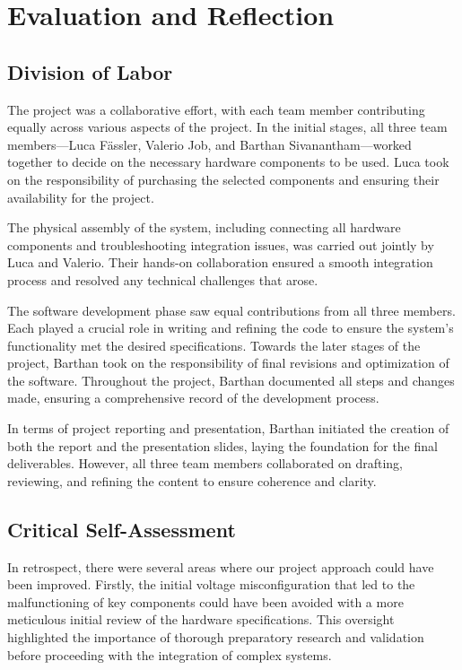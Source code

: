 \documentclass{article}
\begin{document}
\section{Evaluation and Reflection}

\subsection{Division of Labor}
The project was a collaborative effort, with each team member contributing equally across various aspects of the project. In the initial stages, all three team members—Luca Fässler, Valerio Job, and Barthan Sivanantham—worked together to decide on the necessary hardware components to be used. Luca took on the responsibility of purchasing the selected components and ensuring their availability for the project.

The physical assembly of the system, including connecting all hardware components and troubleshooting integration issues, was carried out jointly by Luca and Valerio. Their hands-on collaboration ensured a smooth integration process and resolved any technical challenges that arose.

The software development phase saw equal contributions from all three members. Each played a crucial role in writing and refining the code to ensure the system's functionality met the desired specifications. Towards the later stages of the project, Barthan took on the responsibility of final revisions and optimization of the software. Throughout the project, Barthan documented all steps and changes made, ensuring a comprehensive record of the development process.

In terms of project reporting and presentation, Barthan initiated the creation of both the report and the presentation slides, laying the foundation for the final deliverables. However, all three team members collaborated on drafting, reviewing, and refining the content to ensure coherence and clarity.

\subsection{Critical Self-Assessment}
In retrospect, there were several areas where our project approach could have been improved. Firstly, the initial voltage misconfiguration that led to the malfunctioning of key components could have been avoided with a more meticulous initial review of the hardware specifications. This oversight highlighted the importance of thorough preparatory research and validation before proceeding with the integration of complex systems.
\end{document}
